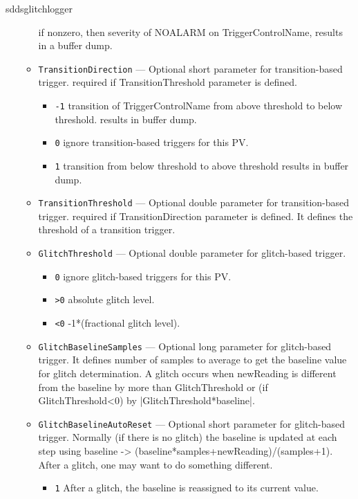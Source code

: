 \begin{sddsprog}{sddsglitchlogger}
\begin{itemize}
\begin{itemize}
                if nonzero, then severity of NOALARM on TriggerControlName, results in a buffer dump.
        \item {\tt TransitionDirection}  --- Optional short parameter for transition-based trigger.
                required if TransitionThreshold parameter is defined.
\begin{itemize}
        \item {\tt -1}  transition of TriggerControlName from above threshold to below threshold.
                        results in buffer dump.
        \item {\tt 0}   ignore transition-based triggers for this PV.
        \item {\tt 1}   transition from below threshold to above threshold results in buffer dump.
\end{itemize}
        \item {\tt TransitionThreshold}  --- Optional double parameter for transition-based trigger.
                required if TransitionDirection parameter is defined. It defines the threshold of
                a transition trigger.
        \item {\tt GlitchThreshold} --- Optional double parameter for glitch-based trigger.
\begin{itemize}
        \item {\tt 0}   ignore glitch-based triggers for this PV.
        \item {\tt >0}   absolute glitch level.
        \item {\tt <0}   -1*(fractional glitch level).
\end{itemize}
        \item {\tt GlitchBaselineSamples} --- Optional long parameter for glitch-based trigger.
                It defines number of samples to average to get the baseline value for glitch determination.
                A glitch occurs when newReading is different from the baseline by more than GlitchThreshold
                or (if GlitchThreshold<0) by |GlitchThreshold*baseline|.
        \item {\tt GlitchBaselineAutoReset} --- Optional short parameter for glitch-based trigger.
                Normally (if there is no glitch) the baseline is updated at each step using
                baseline -> (baseline*samples+newReading)/(samples+1).  After a glitch, one 
                may want to do something different. 
 \begin{itemize}       
        \item {\tt 1}   After a glitch, the baseline is reassigned to its current value.

\end{itemize}
\end{itemize}
\end{itemize}
\end{sddsprog}
